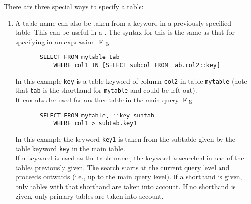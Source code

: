 \begin{description}
       There are three special ways to specify a table:
       \begin{enumerate}
       
       \item
       A table name can also be taken from a keyword in a previously
       specified table. This can be useful in a
       . The syntax for this is
       the same as that for specifying 
       in an expression. E.g.
       \begin{verbatim}
       SELECT FROM mytable tab
           WHERE col1 IN [SELECT subcol FROM tab.col2::key]
       \end{verbatim}
       In this example \texttt{key} is a table keyword of column
       \texttt{col2} in table \texttt{mytable} (note that \texttt{tab}
       is the shorthand for \texttt{mytable} and could be left out).
       \\It can also be used for another table in the main query. E.g.
       \begin{verbatim}
       SELECT FROM mytable, ::key subtab
           WHERE col1 > subtab.key1
       \end{verbatim}
       In this example the keyword \texttt{key1} is taken from the
       subtable given by the table keyword \texttt{key} in the main
       table.
       \\If a keyword is used as the table name, the keyword is
       searched
       in one of the tables previously given. The search starts at
       the current query level and proceeds outwards (i.e., up to the
       main query level). If a shorthand is given, only tables with
       that shorthand are taken into account. If no shorthand is
       given, only primary tables are taken into account.


\end{enumerate}
\end{description}
